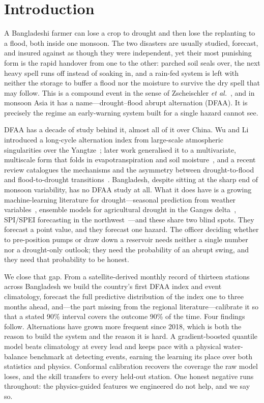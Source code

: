 \documentclass[conference]{IEEEtran}
\begin{document}
\section{Introduction}
A Bangladeshi farmer can lose a crop to drought and then lose the replanting to a flood, both inside one
monsoon. The two disasters are usually studied, forecast, and insured against as though they were
independent, yet their most punishing form is the rapid handover from one to the other: parched soil
seals over, the next heavy spell runs off instead of soaking in, and a rain-fed system is left with
neither the storage to buffer a flood nor the moisture to survive the dry spell that may follow. This is
a compound event in the sense of Zscheischler \emph{et al.}~\cite{zscheischler2018}, and in monsoon Asia
it has a name---drought--flood abrupt alternation (DFAA). It is precisely the regime an early-warning
system built for a single hazard cannot see.

DFAA has a decade of study behind it, almost all of it over China. Wu and Li introduced a long-cycle
alternation index from large-scale atmospheric singularities over the Yangtze~\cite{wu2006}; later work
generalised it to a multivariate, multiscale form that folds in evapotranspiration and soil
moisture~\cite{bai2024}, and a recent review catalogues the mechanisms and the asymmetry between
drought-to-flood and flood-to-drought transitions~\cite{bai2023}. Bangladesh, despite sitting at the
sharp end of monsoon variability, has no DFAA study at all. What it does have is a growing
machine-learning literature for drought---seasonal prediction from weather
variables~\cite{mamun2024}, ensemble models for agricultural drought in the Ganges
delta~\cite{mondol2025}, SPI/SPEI forecasting in the northwest~\cite{akter2023}---and these share two
blind spots. They forecast a point value, and they forecast one hazard. The officer deciding whether to
pre-position pumps or draw down a reservoir needs neither a single number nor a drought-only outlook;
they need the probability of an abrupt swing, and they need that probability to be honest.

We close that gap. From a satellite-derived monthly record of thirteen stations across Bangladesh we
build the country's first DFAA index and event climatology, forecast the full predictive distribution of
the index one to three months ahead, and---the part missing from the regional literature---calibrate it
so that a stated 90\% interval covers the outcome 90\% of the time. Four findings follow. Alternations
have grown more frequent since 2018, which is both the reason to build the system and the reason it is
hard. A gradient-boosted quantile model beats climatology at every lead and keeps pace with a physical
water-balance benchmark at detecting events, earning the learning its place over both statistics and
physics. Conformal calibration recovers the coverage the raw model loses, and the skill transfers to
every held-out station. One honest negative runs throughout: the physics-guided features we engineered do
not help, and we say so.
\end{document}
